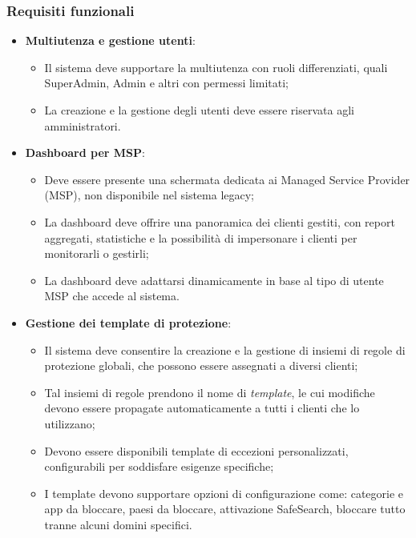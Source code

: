 \subsubsection{Requisiti funzionali}
\begin{itemize}
  \item \textbf{Multiutenza e gestione utenti}:
    \begin{itemize}
      \item Il sistema deve supportare la multiutenza con ruoli differenziati, quali SuperAdmin, Admin e altri con permessi limitati;
      \item La creazione e la gestione degli utenti deve essere riservata agli amministratori.
    \end{itemize}

  \item \textbf{Dashboard per MSP}:
    \begin{itemize}
      \item Deve essere presente una schermata dedicata ai Managed Service Provider (MSP), non disponibile nel sistema legacy;
      \item La dashboard deve offrire una panoramica dei clienti gestiti, con report aggregati, statistiche e la possibilità di impersonare i clienti per monitorarli o gestirli;
      \item La dashboard deve adattarsi dinamicamente in base al tipo di utente MSP che accede al sistema.
    \end{itemize}

  \item \textbf{Gestione dei template di protezione}:
    \begin{itemize}
      \item Il sistema deve consentire la creazione e la gestione di insiemi di regole di protezione globali, che possono essere assegnati a diversi clienti;
      \item Tal insiemi di regole prendono il nome di \emph{template}, le cui modifiche devono essere propagate automaticamente a tutti i clienti che lo utilizzano;
      \item Devono essere disponibili template di eccezioni personalizzati, configurabili per soddisfare esigenze specifiche;
      \item I template devono supportare opzioni di configurazione come: categorie e app da bloccare, paesi da bloccare, attivazione SafeSearch, bloccare tutto tranne alcuni domini specifici.
    \end{itemize}


\end{itemize}
